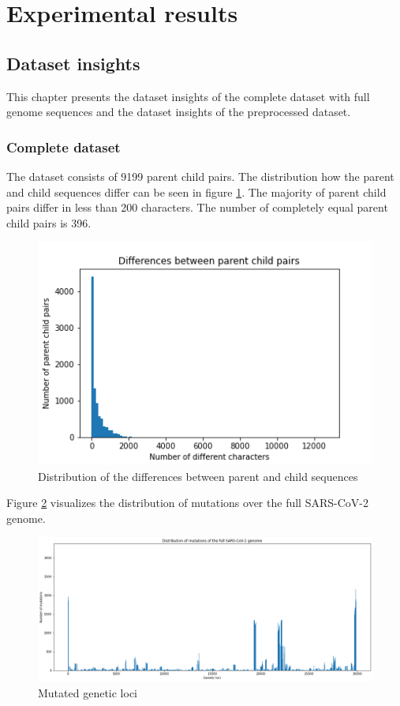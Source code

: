 \section{Experimental results} \label{experiments}

\subsection{Dataset insights}  \label{ch:experimentsA}

This chapter presents the dataset insights of the complete dataset with full genome sequences and the dataset insights of the preprocessed dataset.

\subsubsection{Complete dataset}  \label{ch:experimentsAa}

The dataset consists of 9199 parent child pairs.
The distribution how the parent and child sequences differ can be seen in figure \ref{distributionDifferencesParentChild}. The majority of parent child pairs differ in less than 200 characters. The number of completely equal parent child pairs is 396.

\begin{figure}[ht]
	\centering
	\includegraphics[width=0.7\linewidth]{figures/distributionDifferencesParentChild.png}
	\caption{Distribution of the differences between parent and child sequences \cite{own representation}}
	\label{distributionDifferencesParentChild}
\end{figure}

Figure \ref{mutatedGeneticLoci} visualizes the distribution of mutations over the full \ac{SARS-CoV-2} genome.

\begin{figure}[ht]
	\centering
	\includegraphics[width=1.0\linewidth]{figures/mutatedGeneticLoci.png}
	\caption{Mutated genetic loci \cite{own representation}}
	\label{mutatedGeneticLoci}
\end{figure}


